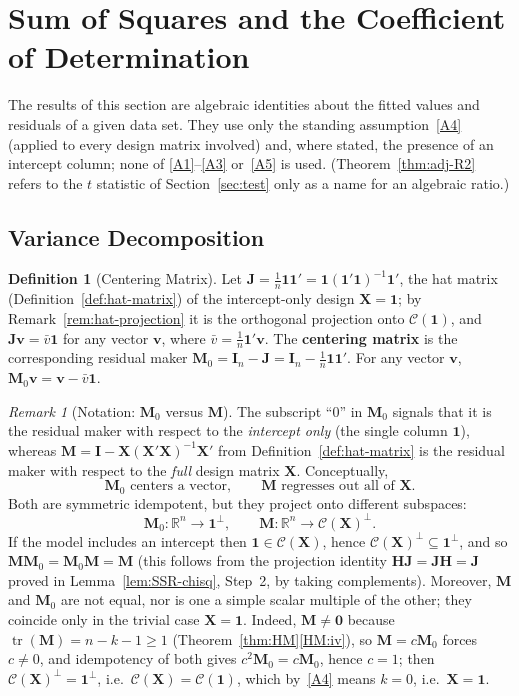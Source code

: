 \documentclass[14pt]{extarticle}
\theoremstyle{plain}
\theoremstyle{definition}
\newtheorem{definition}[theorem]{Definition}
\theoremstyle{remark}
\newtheorem{remark}[theorem]{Remark}
\DeclareMathOperator\tr{tr}
\newcommand{\bX}{\mathbf{X}}
\newcommand{\bI}{\mathbf{I}}
\newcommand{\bH}{\mathbf{H}}
\newcommand{\bM}{\mathbf{M}}
\newcommand{\bone}{\mathbf{1}}
\newcommand{\bzero}{\mathbf{0}}
\newcommand{\bv}{\mathbf{v}}
\newcommand{\Real}{\mathbb{R}}
\newcommand{\calC}{\mathcal{C}}
\newcommand{\bJ}{\mathbf{J}}
\begin{document}
\section{Sum of Squares and the Coefficient of Determination}\label{sec:R2}

The results of this section are algebraic identities about the fitted values and residuals of a given data set. They use only the standing assumption~\ref{A4} (applied to every design matrix involved) and, where stated, the presence of an intercept column; none of \ref{A1}--\ref{A3} or~\ref{A5} is used. (Theorem~\ref{thm:adj-R2} refers to the $t$ statistic of Section~\ref{sec:test} only as a name for an algebraic ratio.)

\subsection{Variance Decomposition}

\begin{definition}[Centering Matrix]\label{def:centering}
Let $\bJ = \frac{1}{n}\bone\bone' = \bone(\bone'\bone)^{-1}\bone'$, the hat matrix (Definition~\ref{def:hat-matrix}) of the intercept-only design $\bX = \bone$; by Remark~\ref{rem:hat-projection} it is the orthogonal projection onto $\calC(\bone)$, and $\bJ\bv = \bar{v}\bone$ for any vector $\bv$, where $\bar{v} = \frac{1}{n}\bone'\bv$. The \textbf{centering matrix} is the corresponding residual maker $\bM_0 = \bI_n - \bJ = \bI_n - \frac{1}{n}\bone\bone'$. For any vector $\bv$, $\bM_0\bv = \bv - \bar{v}\bone$.
\end{definition}

\begin{remark}[Notation: $\bM_0$ versus $\bM$]\label{rem:M0-vs-M}
The subscript ``$0$'' in $\bM_0$ signals that it is the residual maker with respect to the \emph{intercept only} (the single column $\bone$), whereas $\bM = \bI - \bX(\bX'\bX)^{-1}\bX'$ from Definition~\ref{def:hat-matrix} is the residual maker with respect to the \emph{full} design matrix $\bX$. Conceptually,
\[
\bM_0 \text{ centers a vector},\qquad \bM \text{ regresses out all of } \bX.
\]
Both are symmetric idempotent, but they project onto different subspaces:
\[
\bM_0 : \Real^n \to \bone^{\perp},\qquad \bM : \Real^n \to \calC(\bX)^{\perp}.
\]
If the model includes an intercept then $\bone \in \calC(\bX)$, hence $\calC(\bX)^\perp \subseteq \bone^\perp$, and so $\bM\bM_0 = \bM_0\bM = \bM$ (this follows from the projection identity $\bH\bJ = \bJ\bH = \bJ$ proved in Lemma~\ref{lem:SSR-chisq}, Step~2, by taking complements). Moreover, $\bM$ and $\bM_0$ are not equal, nor is one a simple scalar multiple of the other; they coincide only in the trivial case $\bX = \bone$. Indeed, $\bM \neq \bzero$ because $\tr(\bM) = n - k - 1 \geqslant 1$ (Theorem~\ref{thm:HM}\ref{HM:iv}), so $\bM = c\bM_0$ forces $c \neq 0$, and idempotency of both gives $c^2\bM_0 = c\bM_0$, hence $c = 1$; then $\calC(\bX)^\perp = \bone^\perp$, i.e.\ $\calC(\bX) = \calC(\bone)$, which by~\ref{A4} means $k = 0$, i.e.\ $\bX = \bone$.
\end{remark}
\end{document}
